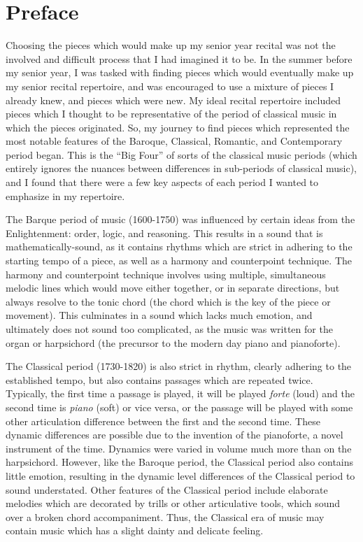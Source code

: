 \chapter*{Preface}\label{pref}

Choosing the pieces which would make up my senior year recital was not the involved and difficult process that I had imagined it to be. In the summer before my senior year, I was tasked with finding pieces which would eventually make up my senior recital repertoire, and was encouraged to use a mixture of pieces I already knew, and pieces which were new. My ideal recital repertoire included pieces which I thought to be representative of the period of classical music in which the pieces originated. So, my journey to find pieces which represented the most notable features of the Baroque, Classical, Romantic, and Contemporary period began. This is the ``Big Four'' of sorts of the classical music periods (which entirely ignores the nuances between differences in sub-periods of classical music), and I found that there were a few key aspects of each period I wanted to emphasize in my repertoire. 

The Barque period of music (1600-1750) was influenced by certain ideas from the Enlightenment: order, logic, and reasoning. This results in a sound that is mathematically-sound, as it contains rhythms which are strict in adhering to the starting tempo of a piece, as well as a harmony and counterpoint technique. The harmony and counterpoint technique involves using multiple, simultaneous melodic lines which would move either together, or in separate directions, but always resolve to the tonic chord (the chord which is the key of the piece or movement). This culminates in a sound which lacks much emotion, and ultimately does not sound too complicated, as the music was written for the organ or harpsichord (the precursor to the modern day piano and pianoforte). 

The Classical period (1730-1820) is also strict in rhythm, clearly adhering to the established tempo, but also contains passages which are repeated twice. Typically, the first time a passage is played, it will be played \textit{forte} (loud) and the second time is \textit{piano} (soft) or vice versa, or the passage will be played with some other articulation difference between the first and the second time. These dynamic differences are possible due to the invention of the pianoforte, a novel instrument of the time. Dynamics were varied in volume much more than on the harpsichord. However, like the Baroque period, the Classical period also contains little emotion, resulting in the dynamic level differences of the Classical period to sound understated. Other features of the Classical period include elaborate melodies which are decorated by trills or other articulative tools, which sound over a broken chord accompaniment. Thus, the Classical era of music may contain music which has a slight dainty and delicate feeling.

